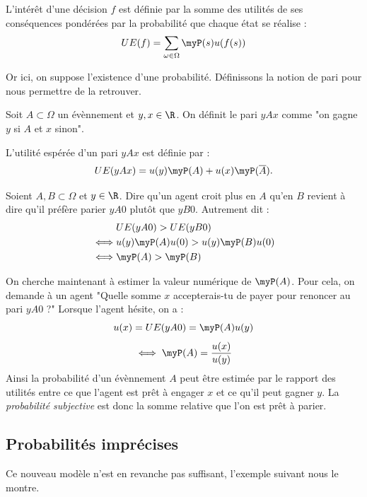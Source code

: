 \begin{definition}
    L'intérêt d'une décision $f$ est définie par la somme des utilités de ses conséquences
    pondérées par la probabilité que chaque état se réalise : 
        \begin{equation}
            UE(f) = \sum_{ \omega \in \Omega} \myP(s) u(f(s)) 
        \end{equation}
\end{definition}

Or ici, on suppose l'existence d'une probabilité. Définissons la notion de pari pour nous 
permettre de la retrouver. 

\begin{definition}[Pari]
    Soit $A \subset \Omega$ un évènnement et $y,x \in \R$. On définit le pari $yAx$ comme 
    "on gagne $y$ si $A$ et $x$ sinon". 

    L'utilité espérée d'un pari $yAx$ est définie par : 
        $$ UE(yAx) = u(y) \myP(A) + u(x) \myP( \overline{A}). $$ 
\end{definition}

Soient $A,B \subset \Omega$ et $ y \in \R$. Dire qu'un agent croit plus en $A$ qu'en $B$ 
revient à dire qu'il préfère parier $yA0$ plutôt que $yB0$. Autrement dit : 
    \begin{align*}
       & UE(yA0) > UE(yB0) \\ 
       \iff & u(y) \myP(A) u(0) > u(y) \myP(B) u(0) \\ 
       \iff & \myP(A) > \myP(B) 
    \end{align*}

On cherche maintenant à estimer la valeur numérique de $ \myP(A)$. Pour cela, on demande à un agent 
"Quelle somme $x$ accepterais-tu de payer pour renoncer au pari $yA0$ ?"
Lorsque l'agent hésite, on a : 
    $$ u(x) = UE(yA0) = \myP(A) u(y) $$ 
    $$ \iff \myP(A) = \frac{u(x)}{u(y)} $$ 
Ainsi la probabilité d'un évènnement $A$ peut être estimée par le rapport des utilités entre ce que l'agent 
est prêt à engager $x$ et ce qu'il peut gagner $y$. 
La \emph{probabilité subjective} est donc la somme relative que l'on est prêt à parier. 

\subsection{Probabilités imprécises}

Ce nouveau modèle n'est en revanche pas suffisant, l'exemple suivant nous le montre. 

